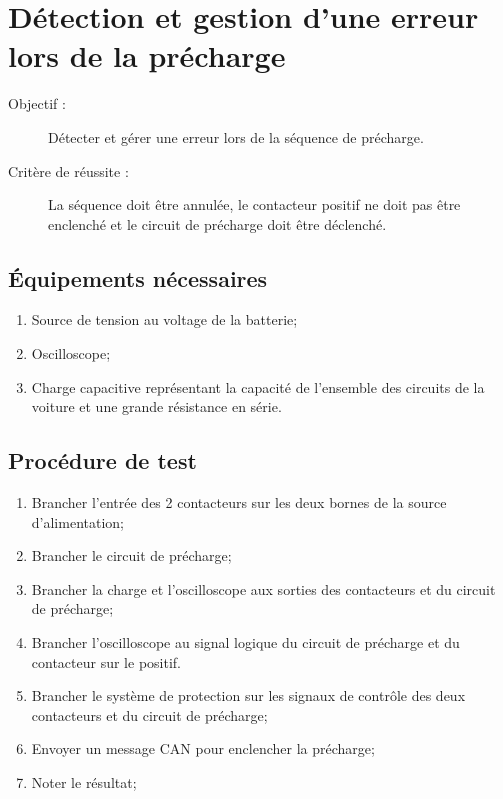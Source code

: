 
\section{Détection et gestion d'une erreur lors de la précharge}

	\begin{description}
		\item[Objectif :] Détecter et gérer une erreur lors de la séquence de précharge.
		\item[Critère de réussite :] La séquence doit être annulée, le contacteur positif ne doit pas être enclenché et le circuit de précharge doit être déclenché.
	\end{description}
	
	\subsection*{Équipements nécessaires}
	\begin{enumerate}
		\item Source de tension au voltage de la batterie;
		\item Oscilloscope;
		\item Charge capacitive représentant la capacité de l'ensemble des circuits de la voiture et une grande résistance en série.
	\end{enumerate}	
	
	\subsection*{Procédure de test}
	\begin{enumerate}
		\item Brancher l'entrée des 2 contacteurs sur les deux bornes de la source d'alimentation;
		\item Brancher le circuit de précharge;
		\item Brancher la charge et l'oscilloscope aux sorties des contacteurs et du circuit de précharge;
		\item Brancher l'oscilloscope au signal logique du circuit de précharge et du contacteur sur le positif.
		\item Brancher le système de protection sur les signaux de contrôle des deux contacteurs et du circuit de précharge;
		\item Envoyer un message CAN pour enclencher la précharge;
		\item Noter le résultat; 
	\end{enumerate}